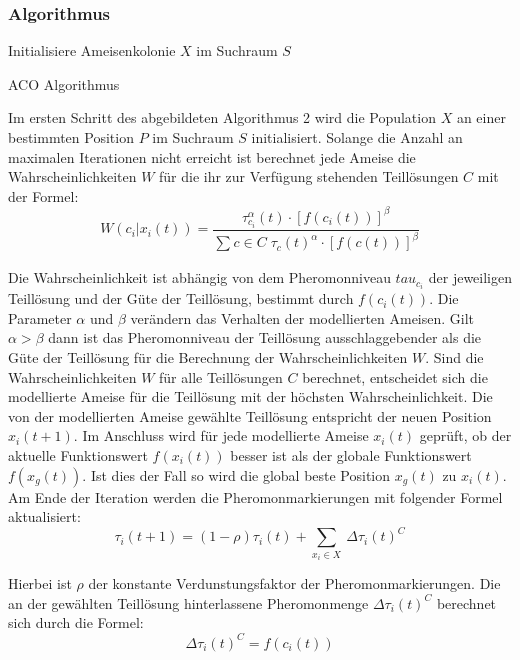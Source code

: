 \documentclass[a4paper, 11pt]{article}
\begin{document}
\subsubsection{Algorithmus}
\begin{framed}
	\begin{algorithm}[H]
		Initialisiere Ameisenkolonie $X$ im Suchraum $S$\;
		\caption{\acs{ACO} Algorithmus}
		\label{acoalgo}
	\end{algorithm}
\end{framed}
Im ersten Schritt des abgebildeten Algorithmus 2 wird die Population $X$ an einer bestimmten Position $P$ im Suchraum $S$ initialisiert. Solange die Anzahl an maximalen Iterationen nicht erreicht ist berechnet jede Ameise die Wahrscheinlichkeiten $W$ für die ihr zur Verfügung stehenden Teillösungen $C$ mit der Formel:
\begin{equation}
W(c_{i}|x_{i}(t)) = \frac{\tau_{c_{i}}^\alpha(t) \cdot [f(c_{i}(t))]^\beta}{\sum_{} c \in C\; \tau_{c}(t)^\alpha \cdot [f(c(t))]^\beta}
\end{equation}
\par Die Wahrscheinlichkeit ist abhängig von dem Pheromonniveau $tau_{c_{i}}$ der jeweiligen Teillösung und der Güte der Teillösung, bestimmt durch $f(c_{i}(t))$. Die Parameter $\alpha$ und $\beta$ verändern das Verhalten der modellierten Ameisen. Gilt $\alpha > \beta$ dann ist das Pheromonniveau der Teillösung ausschlaggebender als die Güte der Teillösung für die Berechnung der Wahrscheinlichkeiten $W$. Sind die Wahrscheinlichkeiten $W$ für alle Teillösungen $C$ berechnet, entscheidet sich die modellierte Ameise für die Teillösung mit der höchsten Wahrscheinlichkeit. Die von der modellierten Ameise gewählte Teillösung entspricht der neuen Position $x_{i}(t+1)$. Im Anschluss wird für jede modellierte Ameise $x_{i}(t)$ geprüft, ob der aktuelle Funktionswert $f(x_{i}(t))$  besser ist als der globale Funktionswert $f(x_{g}(t))$. Ist dies der Fall so wird die global beste Position $x_{g}(t)$ zu $x_{i}(t)$. Am Ende der Iteration werden die Pheromonmarkierungen mit folgender Formel aktualisiert:
\begin{equation}
\tau_{i}(t+1) = (1 - \rho) \tau_{i}(t) + \sum_{x_{i} \in X}\ \Delta \tau_{i}(t)^C
\end{equation}
\par Hierbei ist $\rho$ der konstante Verdunstungsfaktor der Pheromonmarkierungen. Die an der gewählten Teillösung hinterlassene Pheromonmenge $\Delta \tau_{i}(t)^C$ berechnet sich durch die Formel:
\begin{equation}
\Delta \tau_{i}(t)^C = f(c_{i}(t))
\end{equation}
\newpage
\end{document}
